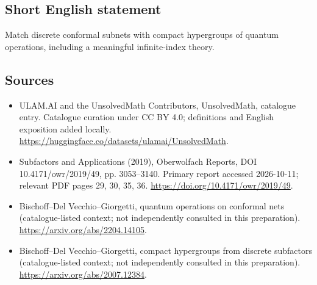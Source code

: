 \documentclass[11pt]{article}
\begin{document}
\subsection{Short English statement}
Match discrete conformal subnets with compact hypergroups of quantum operations, including a meaningful infinite-index theory.
\subsection{Sources}
\begin{itemize}
\item[\hypertarget{source:statement:1}{S1}] ULAM.AI and the UnsolvedMath Contributors, UnsolvedMath, catalogue entry. Catalogue curation under CC BY 4.0; definitions and English exposition added locally.
\url{https://huggingface.co/datasets/ulamai/UnsolvedMath}.
\item[\hypertarget{source:statement:2}{S2}] Subfactors and Applications (2019), Oberwolfach Reports, DOI 10.4171/owr/2019/49, pp. 3053--3140. Primary report accessed 2026-10-11; relevant PDF pages 29, 30, 35, 36.
\url{https://doi.org/10.4171/owr/2019/49}.
\item[\hypertarget{source:statement:3}{S3}] Bischoff--Del Vecchio--Giorgetti, quantum operations on conformal nets (catalogue-listed context; not independently consulted in this preparation).
\url{https://arxiv.org/abs/2204.14105}.
\item[\hypertarget{source:statement:4}{S4}] Bischoff--Del Vecchio--Giorgetti, compact hypergroups from discrete subfactors (catalogue-listed context; not independently consulted in this preparation).
\url{https://arxiv.org/abs/2007.12384}.
\end{itemize}
\label{end:statement}
\end{document}
